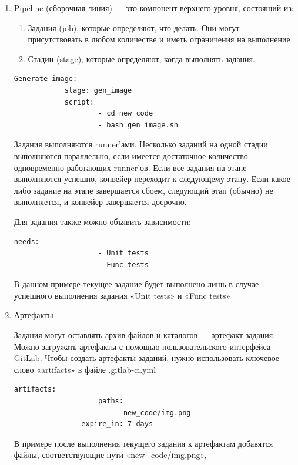 \documentclass[a4paper,14pt]{extreport}
\begin{document}
		\begin{enumerate} 
        			\item Pipeline (сборочная линия) — это компонент верхнего уровня, 
состоящий из: 
		 	\begin{enumerate} 
        				\item Задания (job), которые определяют, что делать. Они могут  присутствовать в любом количестве и иметь ограничения на  выполнение
				\item Стадии (stage), которые определяют, когда выполнять задания. 
    			\end{enumerate} 
			\begin{lstlisting}[label=some-code,caption= пример задачи «Generate image» из стадии «gen\_image»]
			Generate image:
  			stage: gen_image
  			script:
    				- cd new_code
    				- bash gen_image.sh
			\end{lstlisting}
			\par Задания выполняются runner’ами. Несколько заданий на одной 
			стадии выполняются параллельно, если имеется достаточное 
			количество одновременно работающих runner’ов. Если все задания 
			на этапе выполняются успешно, конвейер переходит к следующему 
			этапу. Если какое-либо задание на этапе завершается сбоем, 
			следующий этап (обычно) не выполняется, и конвейер завершается 
			досрочно.
			\par Для задания также можно объявить зависимости:
			\begin{lstlisting}[label=some-code,caption= пример изпользования «needs»]
			needs: 
    				- Unit tests
    				- Func tests
			\end{lstlisting}
			\par В данном примере текущее задание будет выполнено лишь в случае 
			успешного выполнения задания «Unit tests» и «Func tests»
			\item Артефакты
			\par Задания могут оставлять архив файлов и каталогов — артефакт 				задания. Можно загружать артефакты с помощью пользовательского 				интерфейса GitLab. Чтобы создать артефакты заданий, нужно 					использовать ключевое слово «artifacts» в файле .gitlab-ci.yml
			\begin{lstlisting}[label=some-code,caption= пример изпользования «artifacts»]
			  artifacts:
    				paths:
      					- new_code/img.png
    			expire_in: 7 days
			\end{lstlisting}
			\par В примере после выполнения текущего задания к артефактам 					добавятся файлы, соответствующие пути «new\_code/img.png»,

\end{enumerate}
\end{document}
